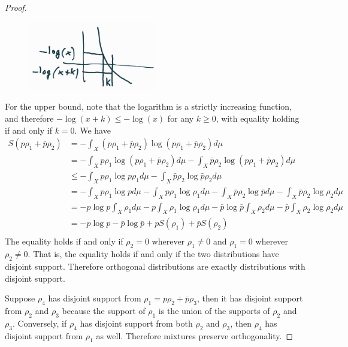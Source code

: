 \begin{mathSection}
\begin{proof}
		
		\begin{figure}[H]
			\centering
			\includegraphics[width=0.5\textwidth]{tempimages/LogMonotone.jpg}
		\end{figure}
		For the upper bound, note that the logarithm is a strictly increasing function, and therefore $- \log(x + k) \leq -\log(x)$ for any $k \geq 0$, with equality holding if and only if $k=0$. We have
		\begin{equation}
			\begin{aligned}
				S(p\rho_1 + \bar{p}\rho_2) &= - \int_X \left(p\rho_1 + \bar{p}\rho_2\right) \log \left(p\rho_1 + \bar{p}\rho_2\right) d\mu \\
				&= - \int_X p\rho_1 \log \left(p\rho_1 + \bar{p}\rho_2\right) d\mu - \int_X \bar{p}\rho_2 \log \left(p\rho_1 + \bar{p}\rho_2\right) d\mu \\
				&\leq  - \int_X p\rho_1 \log p\rho_1 d\mu - \int_X \bar{p}\rho_2 \log \bar{p}\rho_2 d\mu\\
				&=  - \int_X p\rho_1 \log p d\mu - \int_X p\rho_1 \log \rho_1 d\mu - \int_X \bar{p}\rho_2 \log \bar{p} d\mu - \int_X \bar{p}\rho_2 \log \rho_2 d\mu\\
				&=  - p \log p \int_X \rho_1 d\mu - p \int_X \rho_1 \log \rho_1 d\mu - \bar{p} \log \bar{p} \int_X \rho_2 d\mu - \bar{p} \int_X \rho_2 \log \rho_2 d\mu\\
				&=  - p \log p - \bar{p} \log \bar{p} + p S(\rho_1) + \bar{p} S(\rho_2)\\
			\end{aligned}
		\end{equation}
		The equality holds if and only if $\rho_2=0$ wherever $\rho_1\neq0$ and $\rho_1=0$ wherever $\rho_2\neq0$. That is, the equality holds if and only if the two distributions have disjoint support. Therefore orthogonal distributions are exactly distributions with disjoint support.
		
		Suppose $\rho_4$ has disjoint support from $\rho_1 = p \rho_2 + \bar{p} \rho_3$, then it has disjoint support from $\rho_2$ and $\rho_3$ because the support of $\rho_1$ is the union of the supports of $\rho_2$ and $\rho_3$. Conversely, if $\rho_4$ has disjoint support from both $\rho_2$ and $\rho_3$, then $\rho_4$ has disjoint support from $\rho_1$ as well. Therefore mixtures preserve orthogonality.
		

\end{proof}
\end{mathSection}
